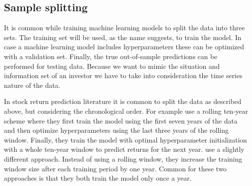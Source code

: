 \documentclass[12pt]{article}
\begin{document}
\subsection{Sample splitting} \label{SampleSplitting}

It is common while training machine learning models to split the data into three sets. The training set will be used, as the name suggests, to train the model. In case a machine learning model includes hyperparameters these can be optimized with a validation set. Finally, the true out-of-sample predictions can be performed for testing data. Because we want to mimic the situation and information set of an investor we have to take into consideration the time series nature of the data. \par

In stock return prediction literature it is common to split the data as described above, but considering the chronological order. For example \citet{Fieberg} use a rolling ten-year scheme where they first train the model using the first seven years of the data and then optimize hyperparameters using the last three years of the rolling window.\footnotemark {} Finally, they train the model with optimal hyperparameter initialization with a whole ten-year window to predict returns for the next year. \citet{guetal} use a slightly different approach. Instead of using a rolling window, they increase the training window size after each training period by one year.\footnotemark {} Common for these two approaches is that they both train the model only once a year. \par
\end{document}
